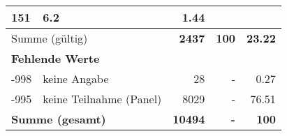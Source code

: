 \begin{longtable}{lXrrr}
       \num{151} &
       \num[round-mode=places,round-precision=2]{6.2} &
         \num[round-mode=places,round-precision=2]{1.44} \\
     \midrule
     \multicolumn{2}{l}{Summe (gültig)} &
       \textbf{\num{2437}} &
     \textbf{\num{100}} &
       \textbf{\num[round-mode=places,round-precision=2]{23.22}} \\
     \multicolumn{5}{l}{\textbf{Fehlende Werte}}\\
       -998 &
       keine Angabe &
         \num{28} &
        - &
         \num[round-mode=places,round-precision=2]{0.27} \\
       -995 &
       keine Teilnahme (Panel) &
         \num{8029} &
        - &
         \num[round-mode=places,round-precision=2]{76.51} \\
     \midrule
     \multicolumn{2}{l}{\textbf{Summe (gesamt)}} &
          \textbf{\num{10494}} &
        \textbf{-} &
        \textbf{\num{100}} \\
     \bottomrule
     \end{longtable}
     
